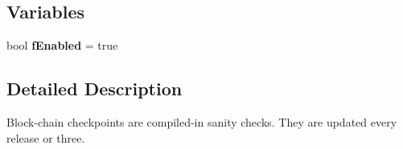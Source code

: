 \subsection*{Variables}
\begin{DoxyCompactItemize}
\item 
\mbox{\label{namespace_checkpoints_ad0487227057b5fe806a9a78cdff587e7}} 
bool {\bfseries f\+Enabled} = true
\end{DoxyCompactItemize}


\subsection{Detailed Description}
Block-\/chain checkpoints are compiled-\/in sanity checks. They are updated every release or three. 